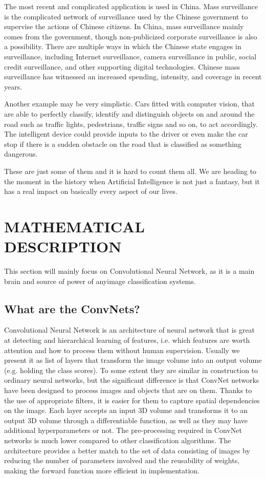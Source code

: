 \documentclass[conference]{IEEEtran}
\begin{document}
The most recent and complicated application is used in China. Mass surveillance is the complicated network of surveillance used by the Chinese government to supervise the actions of Chinese citizens. In China, mass surveillance mainly comes from the government, though non-publicized corporate surveillance is also a possibility. There are multiple ways in which the Chinese state engages in surveillance, including Internet surveillance, camera surveillance in public, social credit surveillance, and other supporting digital technologies. Chinese mass surveillance has witnessed an increased spending, intensity, and coverage in recent years.

Another example may be very simplistic. Cars fitted with computer vision, that are able to perfectly classify, identify and distinguish objects on and around the road such as traffic lights, pedestrians, traffic signs and so on,  to act accordingly. The intelligent device could provide inputs to the driver or even make the car stop if there is a sudden obstacle on the road that is classified as something dangerous.

These are just some of them and it is hard to count them all. We are heading to the moment in the history when Artificial Intelligence is not just a fantasy, but it has a real impact on basically every aspect of our lives.
\\
\section{MATHEMATICAL DESCRIPTION}
This section will mainly focus on Convolutional Neural Network, as it is a main brain and source of power of anyimage classification systems.
\subsection{What are the ConvNets?}
Convolutional Neural Network is an architecture of neural network that is great at detecting and hierarchical learning of features, i.e. which features are worth attention and how to process them without human supervision. Usually we present it as list of layers that transform the image volume into an output volume (e.g. holding the class scores). To some extent they are similar in construction to ordinary neural networks, but the significant difference is that ConvNet networks have been designed to process images and objects that are on them. Thanks to the use of appropriate filters, it is easier for them to capture spatial dependencies on the image. Each layer accepts an input 3D volume and transforms it to an output 3D volume through a differentiable function, as well as they may have additional hyperparameters or not. The pre-processing required in ConvNet networks is much lower compared to other classification algorithms. The architecture provides a better match to the set of data consisting of images by reducing the number of parameters involved and the reusability of weights, making the forward function  more efficient in implementation.
\end{document}
